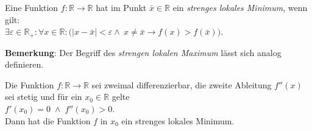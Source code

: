 \begin{Definition} \lb
  Eine Funktion $f:\mathbb{R} \rightarrow \mathbb{R}$ hat im Punkt $\bar{x}\in \mathbb{R}$
  ein \emph{strenges lokales Minimum}, wenn gilt:
  \\[0.2cm]
  \hspace*{1.3cm}
  $\exists \varepsilon \in \mathbb{R}_+: \forall x \in \mathbb{R}:\bigl( 
  |x - \bar{x}| < \varepsilon \wedge\ x \not= \bar{x} \rightarrow f(x) > f(\bar{x})\bigr)$.
\eod
\end{Definition}

\noindent
\textbf{Bemerkung}:  Der Begriff des \emph{strengen lokalen Maximum} l\"asst sich analog definieren.

\begin{Satz} \label{satz:minimum}
  Die Funktion $f:\mathbb{R} \rightarrow \mathbb{R}$ sei zweimal differenzierbar, die
  zweite Ableitung $f''(x)$ sei stetig und f\"ur
  ein $x_0 \in \mathbb{R}$ gelte
  \\[0.2cm]
  \hspace*{1.3cm}
  $f'(x_0) = 0 \;\wedge\; f''(x_0) > 0$.
  \\[0.2cm]
  Dann hat die Funktion $f$ in $x_0$ ein strenges lokales Minimum.
\end{Satz}


